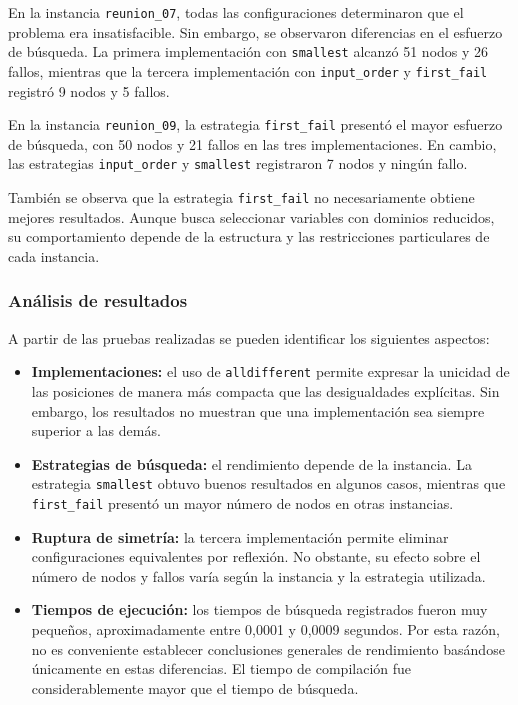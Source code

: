 En la instancia \texttt{reunion\_07}, todas las configuraciones determinaron que el problema era insatisfacible. Sin embargo, se observaron diferencias en el esfuerzo de búsqueda. La primera implementación con \texttt{smallest} alcanzó 51 nodos y 26 fallos, mientras que la tercera implementación con \texttt{input\_order} y \texttt{first\_fail} registró 9 nodos y 5 fallos.

En la instancia \texttt{reunion\_09}, la estrategia \texttt{first\_fail} presentó el mayor esfuerzo de búsqueda, con 50 nodos y 21 fallos en las tres implementaciones. En cambio, las estrategias \texttt{input\_order} y \texttt{smallest} registraron 7 nodos y ningún fallo.

También se observa que la estrategia \texttt{first\_fail} no necesariamente obtiene mejores resultados. Aunque busca seleccionar variables con dominios reducidos, su comportamiento depende de la estructura y las restricciones particulares de cada instancia.

\subsubsection{Análisis de resultados}

A partir de las pruebas realizadas se pueden identificar los siguientes aspectos:

\begin{itemize}
    \item \textbf{Implementaciones:} el uso de \texttt{alldifferent} permite expresar la unicidad de las posiciones de manera más compacta que las desigualdades explícitas. Sin embargo, los resultados no muestran que una implementación sea siempre superior a las demás.

    \item \textbf{Estrategias de búsqueda:} el rendimiento depende de la instancia. La estrategia \texttt{smallest} obtuvo buenos resultados en algunos casos, mientras que \texttt{first\_fail} presentó un mayor número de nodos en otras instancias.

    \item \textbf{Ruptura de simetría:} la tercera implementación permite eliminar configuraciones equivalentes por reflexión. No obstante, su efecto sobre el número de nodos y fallos varía según la instancia y la estrategia utilizada.

    \item \textbf{Tiempos de ejecución:} los tiempos de búsqueda registrados fueron muy pequeños, aproximadamente entre 0,0001 y 0,0009 segundos. Por esta razón, no es conveniente establecer conclusiones generales de rendimiento basándose únicamente en estas diferencias. El tiempo de compilación fue considerablemente mayor que el tiempo de búsqueda.
\end{itemize}

